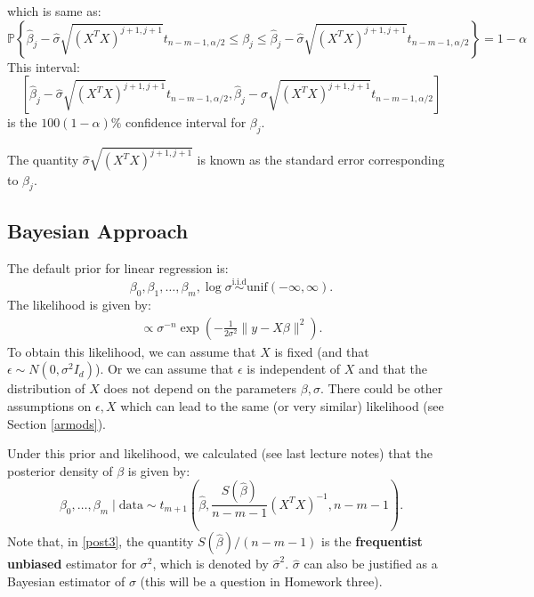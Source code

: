 \documentclass{scrartcl}
\renewcommand{\P}{{\mathbb P}}
\begin{document}
which is same as:
\begin{equation*}
  \P \left\{\hat{\beta}_j - \hat{\sigma} \sqrt{(X^T X)^{j+1,
          j+1}} t_{n-m-1, \alpha/2} \leq \beta_j \leq \hat{\beta}_j - \hat{\sigma} \sqrt{(X^T X)^{j+1,
          j+1}} t_{n-m-1, \alpha/2}    \right\} = 1 -
    \alpha 
\end{equation*}
This interval:
\begin{equation}\label{freqint}
  \left[\hat{\beta}_j - \hat{\sigma} \sqrt{(X^T X)^{j+1,
          j+1}} t_{n-m-1, \alpha/2},  \hat{\beta}_j - \hat{\sigma} \sqrt{(X^T X)^{j+1,
          j+1}} t_{n-m-1, \alpha/2} \right]
  \end{equation}
  is the $100(1-\alpha)\%$ confidence interval for
  $\beta_j$.

The quantity $\hat{\sigma}
\sqrt{(X^T X)^{j+1, j+1}}$ is known as the standard error
corresponding to $\beta_j$.   

\subsection{Bayesian Approach}

The default prior for linear regression is: 
\begin{equation*}
  \beta_0, \beta_1, \dots, \beta_m, \log \sigma
  \overset{\text{i.i.d}}{\sim} \text{unif}(-\infty, \infty). 
\end{equation*}
The likelihood is given by:
\begin{align}\label{liklin}
  \propto \sigma^{-n} \exp \left(-\frac{1}{2 \sigma^2} \|y - X
  \beta\|^2 \right). 
\end{align}
To obtain this likelihood, we can assume that $X$ is fixed (and that
$\epsilon \sim N(0, \sigma^2 I_d)$). Or we can assume that $\epsilon$
is independent of $X$ and that the distribution of $X$ does not depend
on the parameters $\beta, \sigma$. There could be other assumptions on
$\epsilon, X$ which can lead to the same (or very similar) likelihood
(see Section \ref{armods}). 

Under this prior and likelihood, we calculated (see last lecture notes) that the
posterior density of $\beta$ is given by:
\begin{equation}\label{post3}
  \beta_0, \dots, \beta_m \mid \text{data} \sim
  t_{m+1}\left(\hat{\beta},\frac{S(\hat{\beta})}{n - m - 1} \left(X^T
      X 
  \right)^{-1}, n - m - 1 \right). 
\end{equation}
Note that, in \eqref{post3}, the quantity
$S(\hat{\beta})/(n-m-1)$ is the \textbf{frequentist 
  unbiased} estimator for $\sigma^2$, which is denoted by 
$\hat{\sigma}^2$. $\hat{\sigma}$ can also be justified as a Bayesian
estimator of $\sigma$ (this will be a question in Homework three). 
\end{document}
